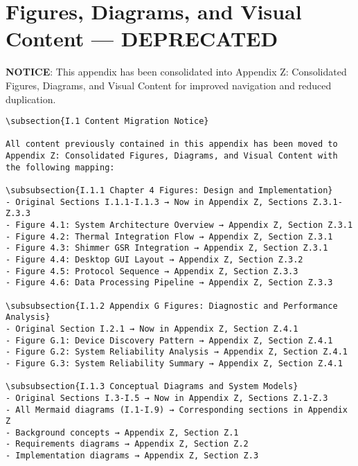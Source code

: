 \chapter{Figures, Diagrams, and Visual Content — DEPRECATED}

\textbf{NOTICE}: This appendix has been consolidated into Appendix Z: Consolidated Figures, Diagrams, and Visual Content for improved navigation and reduced duplication.

\begin{verbatim}
\subsection{I.1 Content Migration Notice}

All content previously contained in this appendix has been moved to Appendix Z: Consolidated Figures, Diagrams, and Visual Content with the following mapping:

\subsubsection{I.1.1 Chapter 4 Figures: Design and Implementation}
- Original Sections I.1.1-I.1.3 → Now in Appendix Z, Sections Z.3.1-Z.3.3
- Figure 4.1: System Architecture Overview → Appendix Z, Section Z.3.1
- Figure 4.2: Thermal Integration Flow → Appendix Z, Section Z.3.1
- Figure 4.3: Shimmer GSR Integration → Appendix Z, Section Z.3.1
- Figure 4.4: Desktop GUI Layout → Appendix Z, Section Z.3.2
- Figure 4.5: Protocol Sequence → Appendix Z, Section Z.3.3
- Figure 4.6: Data Processing Pipeline → Appendix Z, Section Z.3.3

\subsubsection{I.1.2 Appendix G Figures: Diagnostic and Performance Analysis}
- Original Section I.2.1 → Now in Appendix Z, Section Z.4.1
- Figure G.1: Device Discovery Pattern → Appendix Z, Section Z.4.1
- Figure G.2: System Reliability Analysis → Appendix Z, Section Z.4.1
- Figure G.3: System Reliability Summary → Appendix Z, Section Z.4.1

\subsubsection{I.1.3 Conceptual Diagrams and System Models}
- Original Sections I.3-I.5 → Now in Appendix Z, Sections Z.1-Z.3
- All Mermaid diagrams (I.1-I.9) → Corresponding sections in Appendix Z
- Background concepts → Appendix Z, Section Z.1
- Requirements diagrams → Appendix Z, Section Z.2
- Implementation diagrams → Appendix Z, Section Z.3


\end{verbatim}
